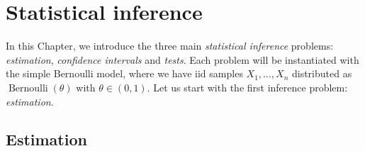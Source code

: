\documentclass[
	fontsize=11pt, %
	twoside=false, %
	numbers=noenddot, %
]{kaobook}
\DeclareMathOperator{\ber}{Bernoulli}
\begin{document}
\mainmatter %


% 

% 


\setchapterpreamble[u]{\margintoc}
\chapter{Statistical inference}
\label{chap:statistical_inference}

In this Chapter, we introduce the three main \emph{statistical inference} problems: \emph{estimation}, \emph{confidence intervals} and \emph{tests}.
Each problem will be instantiated with the simple Bernoulli model, where we have iid samples $X_1, \ldots, X_n$ distributed as $\ber(\theta)$ with $\theta \in (0, 1)$.
Let us start with the first inference problem: \emph{estimation}.

\section{Estimation} %
\label{sec:estimation}
\end{document}
